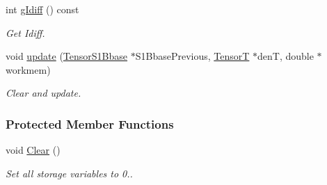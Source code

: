 \begin{DoxyCompactItemize}
int \hyperlink{classCheMPS2_1_1TensorS1Bbase_abebc77c61967d9103abb5d38151e1aff}{g\-Idiff} () const 
\begin{DoxyCompactList}\small\item\em Get Idiff. \end{DoxyCompactList}\item 
void \hyperlink{classCheMPS2_1_1TensorS1Bbase_a8abea6ade905a2f097324486ce2e7c77}{update} (\hyperlink{classCheMPS2_1_1TensorS1Bbase}{Tensor\-S1\-Bbase} $\ast$S1\-Bbase\-Previous, \hyperlink{classCheMPS2_1_1TensorT}{Tensor\-T} $\ast$den\-T, double $\ast$workmem)
\begin{DoxyCompactList}\small\item\em Clear and update. \end{DoxyCompactList}\end{DoxyCompactItemize}
\subsubsection*{Protected Member Functions}
\begin{DoxyCompactItemize}
\item 
\hypertarget{classCheMPS2_1_1TensorS1Bbase_a9dcc971a7e04931b9f64cd1dac56db7e}{void \hyperlink{classCheMPS2_1_1TensorS1Bbase_a9dcc971a7e04931b9f64cd1dac56db7e}{Clear} ()}\label{classCheMPS2_1_1TensorS1Bbase_a9dcc971a7e04931b9f64cd1dac56db7e}

\begin{DoxyCompactList}\small\item\em Set all storage variables to 0.. \end{DoxyCompactList}\end{DoxyCompactItemize}
